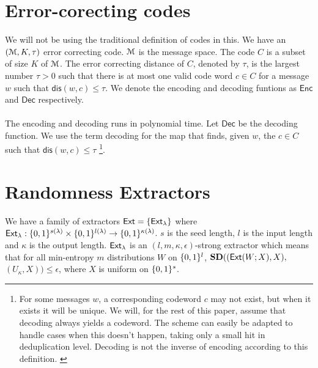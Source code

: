 \section{Error-corecting codes}
We will not be using the traditional definition of codes in this.
We have an $(\mathcal{M}, K, \tau)$ error correcting code. $\mathcal{M}$ is the message space. The code $C$ is a subset of size $K$ of $\mathcal{M}$. The error correcting distance of $C$, denoted by $\tau$, is the largest number $\tau > 0$ such that there is at most one valid code word $c \in C$ for a message $w$ such that $\mathsf{dis}(w,c) \leq \tau$. We denote the encoding and decoding funtions as $\mathsf{Enc}$ and $\mathsf{Dec}$ respectively.
\\ \\The encoding and decoding runs in polynomial time. Let $\mathsf{Dec}$ be the decoding function. We use the term decoding for the map that finds, given $w$, the $c \in C$ such that $\mathsf{dis}(w,c) \leq \tau$\cite{fuzzy} \footnote{For some messages $w$, a corresponding codeword $c$ may not exist, but when it exists it will be unique. We will, for the rest of this paper, assume that decoding always yields a codeword. The scheme can easily be adapted to handle cases when this doesn't happen, taking only a small hit in deduplication level. Decoding is not the inverse of encoding according to this definition. \cite{fuzzy}}.

\section{Randomness Extractors}
We have a family of extractors $\mathsf{Ext} = \{\mathsf{Ext}_{\lambda}\}$ where $\mathsf{Ext}_{\lambda} : \{0,1\}^{s(\lambda)} \times \{0,1\}^{l(\lambda)} \rightarrow \{0,1\}^{\kappa(\lambda)}$. $s$ is the seed length, $l$ is the input length and $\kappa$ is the output length. $\mathsf{Ext}_{\lambda}$ is an $(l,m,\kappa,\epsilon)$-strong extractor which means that for all min-entropy  $m$ distributions $W$ on $\{0,1\}^l$, $\textbf{SD}((\mathsf{Ext}(W; X), X),$ $(U_\kappa,X )) \leq \epsilon $, where $X$ is uniform on $\{0,1\}^s$\cite{fuzzy}.

